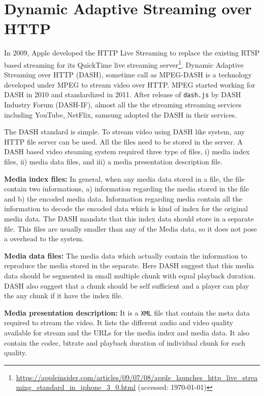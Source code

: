 \section{Dynamic Adaptive Streaming over HTTP}
In 2009, Apple developed the HTTP Live Streaming to replace the existing RTSP based streaming for its QuickTime live streaming server\footnote{\url{https://appleinsider.com/articles/09/07/08/apple_launches_http_live_streaming_standard_in_iphone_3_0.html} (accessed: \today)}. Dynamic Adaptive Streaming over HTTP (DASH), sometime call as MPEG-DASH is a technology developed under MPEG to stream video over HTTP. MPEG started working for DASH in 2010 and standardized in 2011\cite{ISO/IEC23009-1:2019}. After release of {\tt dash.js} by DASH Industry Forum (DASH-IF), almost all the the streaming streaming services including YouTube, NetFlix, samsung adopted the DASH in their services.

The DASH standard is simple. To stream video using DASH like system, any HTTP file server can be used. All the files need to be stored in the server. A DASH based video steaming system required three type of files, i) media index files, ii) media data files, and iii) a media presentation description file.

{\bf Media index files:} In general, when any media data stored in a file, the file contain two informations, a) information regarding the media stored in the file and b) the encoded media data. Information regarding media contain all the information to decode the encoded data which is kind of index for the original media data. The DASH mandate that this index data should store in a separate file. This files are usually smaller than any of the Media data, so it does not pose a overhead to the system.

{\bf Media data files:} The media data which actually contain the information to reproduce the media stored in the separate. Here DASH suggest that this media data should be segmented in small multiple chunk with equal playback duration. DASH also suggest that a chunk should be self sufficient and a player can play the any chunk if it have the index file.

{\bf Media presentation description:} It is a {\tt XML} file that contain the meta data required to stream the video. It lists the different audio and video quality available for stream and the URLs for the media index and media data. It also contain the codec, bitrate and playback duration of individual chunk for each quality.

